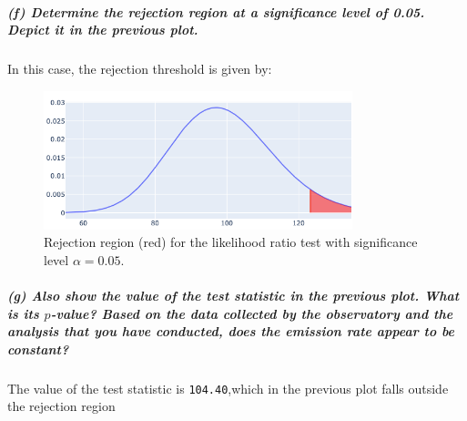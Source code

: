 \documentclass[11pt, english]{article}
\begin{document}
    
    \hypertarget{f-determine-the-rejection-region-at-a-significance-level-of-0.05.-depict-it-in-the-previous-plot.}{%
\subparagraph{(f) Determine the rejection region at a significance level
of 0.05. Depict it in the previous
plot.\\[2ex]}\label{f-determine-the-rejection-region-at-a-significance-level-of-0.05.-depict-it-in-the-previous-plot.}}

    In this case, the rejection threshold is given by:

\begin{figure}[H]
	\centering
	\includegraphics[width=0.8\textwidth]{rejectionRegion1}
	\caption{Rejection region (red) for the likelihood ratio test with significance level $\alpha = 0.05$.}
\end{figure}

    
    
    \hypertarget{g-also-show-the-value-of-the-test-statistic-in-the-previous-plot.-what-is-its-p-value-based-on-the-data-collected-by-the-observatory-and-the-analysis-that-you-have-conducted-does-the-emission-rate-appear-to-be-constant}{%
\subparagraph{\texorpdfstring{(g) Also show the value of the test
statistic in the previous plot. What is its \(p\)-value? Based on the
data collected by the observatory and the analysis that you have
conducted, does the emission rate appear to be
constant?\\[2ex]}{(g) Also show the value of the test statistic in the previous plot. What is its p-value? Based on the data collected by the observatory and the analysis that you have conducted, does the emission rate appear to be constant?}}\label{g-also-show-the-value-of-the-test-statistic-in-the-previous-plot.-what-is-its-p-value-based-on-the-data-collected-by-the-observatory-and-the-analysis-that-you-have-conducted-does-the-emission-rate-appear-to-be-constant}}

    The value of the test statistic is \texttt{104.40},which in the previous plot falls outside the rejection region
\end{document}
